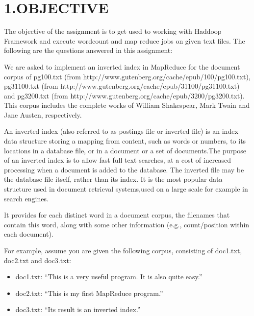 \documentclass{article}
\begin{document}
\mdxtitleblockstart{}

\mdxauthorstart{}
\mdxauthorend\mdtitleauthorrunning{}{}\mdxtitleblockend%

\section{1.\hspace*{0.5em}OBJECTIVE}\label{heading}%

\noindent The objective of the assignment is to get used to working with Haddoop Framework and execute wordcount and map reduce jobs on given text files.
The following are the questions answered  in this assignment:%

We are asked to implement an inverted index in MapReduce for the document corpus of pg100.txt (from http://www.gutenberg.org/cache/epub/100/pg100.txt), pg31100.txt (from http://www.gutenberg.org/cache/epub/31100/pg31100.txt) and pg3200.txt (from http://www.gutenberg.org/cache/epub/3200/pg3200.txt). This corpus includes the complete works of William Shakespear, Mark Twain and Jane Austen, respectively.%

An inverted index (also referred to as postings file or inverted file) is an index data structure storing a mapping from content, such as words or numbers, to its locations in a database file, or in a document or a set of documents.The purpose of an inverted index is to allow fast full text searches, at a cost of increased processing when a document is added to the database. The inverted file may be the database file itself, rather than its index. It is the most popular data structure used in document retrieval systems,used on a large scale for example in search engines.%

It provides for each distinct word in a document corpus, the filenames that contain this word, along with some other information (e.g., count/position within each document).%

For example, assume you are given the following corpus, consisting of doc1.txt, doc2.txt and doc3.txt:%

\begin{itemize}[noitemsep,topsep=\mdcompacttopsep]%

\item doc1.txt: “This is a very useful program. It is also quite easy.”%

\item doc2.txt: “This is my first MapReduce program.”%

\item doc3.txt: “Its result is an inverted index.”%
\end{itemize}%
\end{document}
